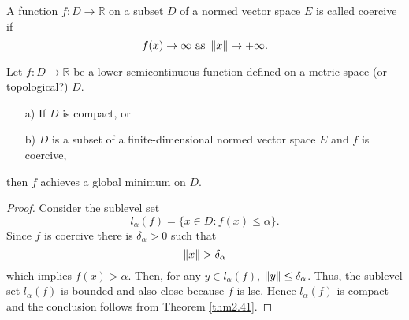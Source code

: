     \begin{definition}
        A function $f : D \to \mathbb{R}$ on a subset $D$ of a normed vector 
        space $E$
        is called coercive if 
        $$
            f(x) \to \infty \text{ as } \left\lVert x\right\rVert \to + \infty.
        $$
    \end{definition}
%
    \begin{corollary}
        Let $f : D \to \mathbb{R}$ be a lower semicontinuous function defined on
        a metric space  (or topological?) $D$.
        \begin{itemize}
            \item[a)]
                If $D$ is compact, or
            \item[b)] $D$ is a subset of a finite-dimensional normed vector 
            space
            $E$ and $f$ is coercive,
        \end{itemize}
        then $f$ achieves a global minimum on $D$.
    \end{corollary}
    \begin{proof}
        Consider the sublevel set
        $$
            l_{\alpha}(f) = \{ x \in D : f(x) \leq \alpha \}.
        $$
        Since $f$ is coercive there is $\delta_{\alpha} > 0$ such that
        $$
            \left\lVert x\right\rVert > \delta_{\alpha}
        $$
        which implies $f(x) > \alpha $. Then, for any $y \in l_{\alpha}(f)$, 
        $\left\lVert y\right\rVert \leq \delta_{\alpha}$. Thus, the sublevel set $l_{\alpha}(f)$
        is bounded and also close because $f$ is lsc. Hence $l_{\alpha}(f)$ is
        compact and the conclusion follows from Theorem \eqref{thm2.41}.
    \end{proof}












